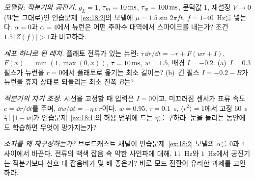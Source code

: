 \begin{exercise}[\lvlB]
\label{ex:18:4}
\emph{모델링: 적분기와 공진기.} $g_L=1$, $\tau_m=10\,\text{ms}$, $\tau_w=100\,\text{ms}$, 문턱값 $1$, 재설정 $V\to0$($W$는 그대로)인 연습문제~\ref{ex:18:2}의 모델에 $\mu=1.5\sin2\pi ft$, $f=1$--$40$~Hz를 넣는다. $\alpha=0$과 $\alpha=4$에서 뉴런은 어떤 주파수 대역에서 스파이크를 내는가? 조건 $1.5\,|Z(f)|>1$과 비교하라.
\end{exercise}

\begin{exercise}[\lvlB]
\label{ex:18:5}
\emph{세포 하나로 된 래치.} 플래토 전류가 있는 뉴런: $\tau\,\dd r/\dd t=-r+F(wr+I)$, $F(x)=\min(1,\max(0,x))$, $\tau=10\,\text{ms}$, $w=1.5$, 배경 $I=-0.2$. (a)~$I=0.3$ 펄스가 뉴런을 $r=0$에서 플래토로 옮기는 최소 길이는? (b)~긴 펄스 $I=-0.2-B$가 뉴런을 휴지 상태로 되돌리는 최소 진폭 $B$는?
\end{exercise}

\begin{exercise}[\lvlB]
\label{ex:18:6}
\emph{적분기의 자기 조정.} 시선을 고정할 때 입력은 $I=0$이고, 미끄러짐 센서가 표류 속도 $e=\dd r/\dd t$를 주며, $\dd w/\dd t=-\eta\,e\,r$이다. $w=0.95$, $\tau=0.1$~s, $\langle r^2\rangle=1$에서 고정 $60$~s 뒤 $|1-w|$가 연습문제~\ref{ex:18:1}의 허용 범위에 드는 $\eta$를 구하라. 눈을 돌리는 동안에도 학습하면 무엇이 망가지는가?
\end{exercise}

\begin{exercise}[\lvlC]
\label{ex:18:7}
\emph{소자를 왜 재구성하는가?} 브로드캐스트 채널이 연습문제~\ref{ex:18:2} 모델의 $\alpha$를 $0$과 $4$ 사이에서 바꾼다. 전류의 백색 잡음 속 약한 사인파에 대해, $11$~Hz와 $1$~Hz에서 공진기는 적분기보다 신호 대 잡음비가 몇 배 좋은가? 바로 모드 전환이 유리한 과제를 고안하라.
\end{exercise}
